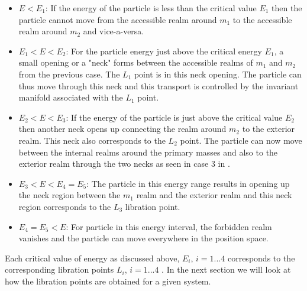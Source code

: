 \begin{itemize}
\item $E<E_1$: If the energy of the particle is less than the critical value $E_1$ then the particle cannot move from the accessible realm around $m_1$ to the accessible realm around $m_2$ and vice-a-versa.
\item $E_1<E<E_2$: For the particle energy just above the critical energy $E_1$, a small opening or a "neck" forms between the accessible realms of $m_1$ and $m_2$ from the previous case. The $L_1$ point is in this neck opening.  The particle can thus move through this neck and this transport is controlled by the invariant manifold associated with the $L_1$ point.
\item $E_2<E<E_3$: If the energy of the particle is just above the critical value $E_2$ then another neck opens up connecting the realm around $m_2$ to the exterior realm. This neck also corresponds to the $L_2$ point. The particle can now move between the internal realms around the primary masses and also to the exterior realm through the two necks as seen in case 3 in .
\item $E_3<E<E_4=E_5$: The particle in this energy range results in opening up the neck region between the $m_1$ realm and the exterior realm and this neck region corresponds to the $L_3$ libration point.
\item $E_4=E_5 < E$: For particle in this energy interval, the forbidden realm vanishes and the particle can move everywhere in the position space.
\end{itemize}
%
Each critical value of energy as discussed above, $E_i$, $i=1...4$ corresponds to the corresponding libration points $L_i$, $i=1...4$ \cite{invariant}. In the next section we will look at how the libration points are obtained for a given system.

